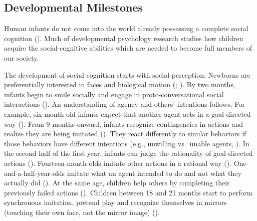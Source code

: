 \documentclass[
]{scrbook}
\begin{document}
\subsection{Developmental Milestones}\label{developmental-milestones}

Human infants do not come into the world already possessing a complete social cognition (). Much of developmental psychology research studies how children acquire the social-cognitive abilities which are needed to become full members of our society.

The development of social cognition starts with social perception: Newborns are preferentially interested in faces and biological motion (; ). By two months, infants begin to smile socially and engage in proto-conversational social interactions (). An understanding of agency and others' intentions follows. For example, six-month-old infants expect that another agent acts in a goal-directed way (). From 9 months onward, infants recognize contingencies in actions and realize they are being imitated (). They react differently to similar behaviors if those behaviors have different intentions (e.g., unwilling vs.~unable agents, ). In the second half of the first year, infants can judge the rationality of goal-directed actions (). Fourteen-month-olds imitate other actions in a rational way (). One-and-a-half-year-olds imitate what an agent intended to do and not what they actually did (). At the same age, children help others by completing their previously failed actions (). Children between 18 and 21 months start to perform synchronous imitation, pretend play and recognize themselves in mirrors (touching their own face, not the mirror image) ().
\end{document}
